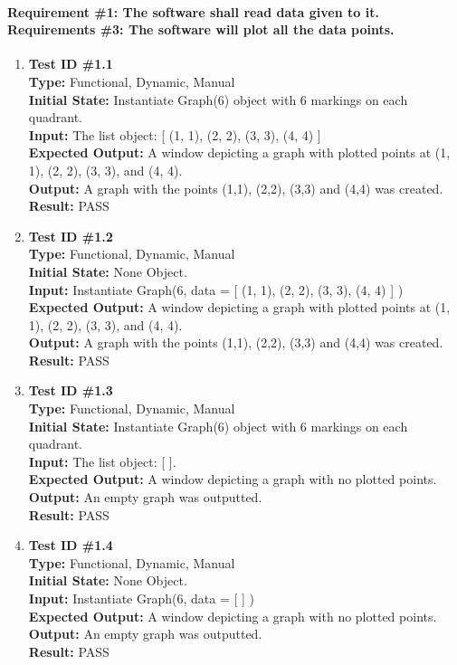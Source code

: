 \documentclass[12pt, titlepage]{article}
\begin{document}
	\paragraph{Requirement \#1: The software shall read data given to it. \\ Requirements \#3: The software will plot all the data points.}
		\begin{enumerate}
			\item{\textbf{Test ID \#1.1\\}}
			\textbf{Type:} Functional, Dynamic, Manual\\
			\textbf{Initial State:} Instantiate Graph(6) object with 6 markings on each quadrant.\\
			\textbf{Input:} The list object: [ (1, 1),  (2, 2), (3, 3), (4, 4) ]\\
			\textbf{Expected Output:} A window depicting a graph with plotted points at (1, 1), (2, 2), (3, 3), and (4, 4). \\
			\textbf{Output:}	A graph with the points (1,1), (2,2), (3,3) and (4,4) was created.\\	
			\textbf{Result:} PASS

					
			\item{\textbf{Test ID \#1.2\\}}
			\textbf{Type:} Functional, Dynamic, Manual\\
			\textbf{Initial State:} None Object.\\
			\textbf{Input:} Instantiate Graph(6, data = [ (1, 1),  (2, 2), (3, 3), (4, 4) ] )\\
			\textbf{Expected Output:} A window depicting a graph with plotted points at (1, 1), (2, 2), (3, 3), and (4, 4). \\
			\textbf{Output:}	A graph with the points (1,1), (2,2), (3,3) and (4,4) was created.\\	
			\textbf{Result:} PASS
				
			\item{\textbf{Test ID \#1.3\\}}
			\textbf{Type:} Functional, Dynamic, Manual\\
			\textbf{Initial State:} Instantiate Graph(6) object with 6 markings on each quadrant.\\
			\textbf{Input:} The list object: [	].\\
			\textbf{Expected Output:} A window depicting a graph with no plotted points.\\
			\textbf{Output:}	An empty graph was outputted.\\
			\textbf{Result:} PASS

			\item{\textbf{Test ID \#1.4\\}}
			\textbf{Type:} Functional, Dynamic, Manual\\
			\textbf{Initial State:} None Object.\\
			\textbf{Input:} Instantiate Graph(6, data = [  ] )\\
			\textbf{Expected Output:} A window depicting a graph with no plotted points.\\
			\textbf{Output:}	An empty graph was outputted.\\
			\textbf{Result:} PASS
	\end{enumerate}
\end{document}
